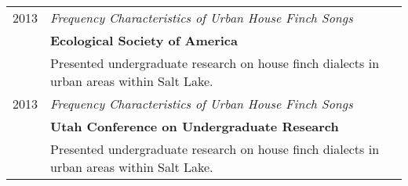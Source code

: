 \documentclass[a4paper,10pt]{article}
\begin{document}
\begin{longtable}{rl}
	\textsc{2013} & \emph{Frequency Characteristics of Urban House Finch Songs}
	\\& \textbf{Ecological Society of America}
	\\& \small{Presented undergraduate research on house finch dialects in urban
	areas within Salt Lake.}                                                                             \\

	\textsc{2013} & \emph{Frequency Characteristics of Urban House Finch Songs}
	\\& \textbf{Utah Conference on Undergraduate Research}
	\\& \small{Presented undergraduate research on house finch dialects in urban
		areas within Salt Lake.}
\end{longtable}


\end{document}
